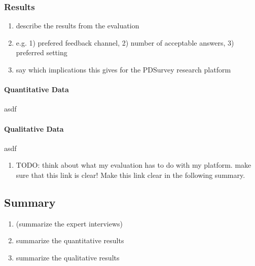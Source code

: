 \subsubsection{Results}

	\begin{enumerate}
	\item describe the results from the evaluation
	\item e.g. 1) prefered feedback channel, 2) number of acceptable answers, 3) preferred setting
	\item say which implications this gives for the PDSurvey research platform
	\end{enumerate}

	\paragraph{Quantitative Data}
		asdf


	\paragraph{Qualitative Data}
		asdf


	\begin{enumerate}
	\item TODO: think about what my evaluation has to do with my platform. make sure that this link is clear! Make this link clear in the following summary.
	\end{enumerate}


\subsection{Summary}

	\begin{enumerate}
	\item (summarize the expert interviews)
	\item summarize the quantitative results
	\item summarize the qualitative results 
	\end{enumerate}
